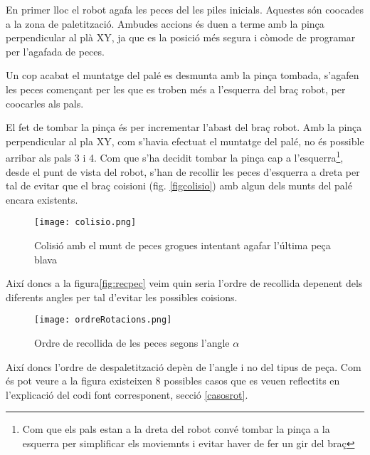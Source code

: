 En primer lloc el robot agafa les peces del les piles inicials.
Aquestes són co\lgem ocades a la zona de paletització. Ambudes
accions és duen a terme amb la pinça perpendicular al plà XY, ja que es la
posició més segura i còmode de programar per l'agafada de peces.

Un cop acabat el muntatge del palé es desmunta amb la pinça tombada,
s'agafen les peces començant per les que es
troben més a l'esquerra del braç robot, per co\lgem ocarles als pals.

El fet de tombar la pinça és per incrementar l'abast del braç robot. Amb la
pinça perpendicular al pla XY, com s'havia efectuat el muntatge del palé, no
és possible arribar als pals 3 i 4. Com que s'ha decidit tombar la pinça
cap a l'esquerra\footnote{Com que els pals estan a la dreta del robot convé
tombar la pinça a la esquerra per simplificar els moviemnts i evitar haver
de fer un gir del braç}, desde el punt de vista del robot, s'han de recollir
les peces d'esquerra a dreta per tal de evitar que el braç co\lgem isioni
(fig. \ref{figcolisio}) amb algun dels munts del palé encara existents.

\begin{figure}[H]
\begin{center}
 \texttt{[image: colisio.png]}
\end{center}
  \caption{Colisió amb el munt de peces grogues intentant agafar l'última peça blava}
\end{figure}\label{figcolisio}

Així doncs a la figura\ref{fig:recpec}
veim quin seria l'ordre de recollida depenent dels diferents angles per tal
d'evitar les possibles co\lgem isions.

\begin{figure}[H]
\begin{center}\label{figrecpec}
 \texttt{[image: ordreRotacions.png]}
\end{center}
  \caption{Ordre de recollida de les peces segons l'angle $\alpha$}
\end{figure}

Així doncs l'ordre de despaletització depèn de l'angle i no del tipus de peça.
Com és pot veure a la figura existeixen 8 possibles casos que es veuen
reflectits en l'explicació del codi font corresponent, secció \ref{casosrot}.